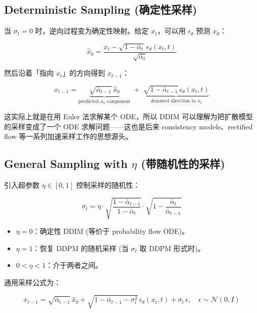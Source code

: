 \documentclass[11pt,a4paper]{article}
\theoremstyle{definition}
\newcommand{\N}{\mathcal{N}}          %
\newcommand{\alphat}{\bar{\alpha}_t}
\begin{document}
\subsection{Deterministic Sampling (确定性采样)}

当 $\sigma_t = 0$ 时，逆向过程变为确定性映射。给定 $x_t$，可以用 $\epsilon_\theta$ 预测 $x_0$：

\begin{equation}\label{eq:ddim_pred_x0}
    \hat{x}_0 = \frac{x_t - \sqrt{1 - \alphat}\, \epsilon_\theta(x_t, t)}{\sqrt{\alphat}}
\end{equation}

然后沿着「指向 $x_t$」的方向得到 $x_{t-1}$：

\begin{equation}\label{eq:ddim_sample_det}
    x_{t-1} = \underbrace{\sqrt{\bar{\alpha}_{t-1}}\, \hat{x}_0}_{\text{predicted } x_0 \text{ component}}
            \;+\; \underbrace{\sqrt{1 - \bar{\alpha}_{t-1}}\, \epsilon_\theta(x_t, t)}_{\text{denoised direction to } x_t}
\end{equation}

这实际上就是在用 Euler 法求解某个 ODE，所以 DDIM 可以理解为把扩散模型的采样变成了一个 ODE 求解问题——这也是后来 consistency models、rectified flow 等一系列加速采样工作的思想源头。

\subsection{General Sampling with $\eta$ (带随机性的采样)}

引入超参数 $\eta \in [0, 1]$ 控制采样的随机性：

\begin{equation}\label{eq:ddim_eta}
    \sigma_t = \eta \cdot \sqrt{\frac{1 - \bar{\alpha}_{t-1}}{1 - \alphat}} \cdot \sqrt{1 - \frac{\alphat}{\bar{\alpha}_{t-1}}}
\end{equation}

\begin{itemize}
    \item $\eta = 0$：确定性 DDIM (等价于 probability flow ODE)。
    \item $\eta = 1$：恢复 DDPM 的随机采样 (当 $\sigma_t$ 取 DDPM 形式时)。
    \item $0 < \eta < 1$：介于两者之间。
\end{itemize}

通用采样公式为：

\begin{equation}\label{eq:ddim_sample_general}
    x_{t-1} = \sqrt{\bar{\alpha}_{t-1}}\, \hat{x}_0
            + \sqrt{1 - \bar{\alpha}_{t-1} - \sigma_t^2}\, \epsilon_\theta(x_t, t)
            + \sigma_t\, \epsilon, \quad \epsilon \sim \N(0, I)
\end{equation}
\end{document}
